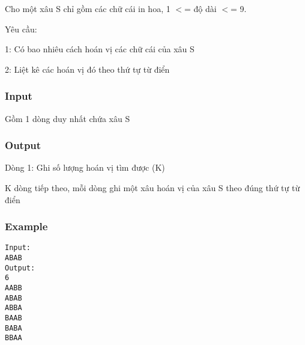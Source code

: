 



   Cho một xâu S chỉ gồm các chữ cái in hoa, 1 $<$= độ dài $<$= 9.  

   Yêu cầu:  

   1: Có bao nhiêu cách hoán vị các chữ cái của xâu S  

   2: Liệt kê các hoán vị đó theo thứ tự từ điển  

\subsubsection{   Input  }

   Gồm 1 dòng duy nhất chứa xâu S  

\subsubsection{   Output  }

   Dòng 1: Ghi số lượng hoán vị tìm được (K)  

   K dòng tiếp theo, mỗi dòng ghi một xâu hoán vị của xâu S theo đúng thứ tự từ điển  

\subsubsection{   Example  }
\begin{verbatim}
Input:
ABAB
Output:
6
AABB
ABAB
ABBA
BAAB
BABA
BBAA

\end{verbatim}